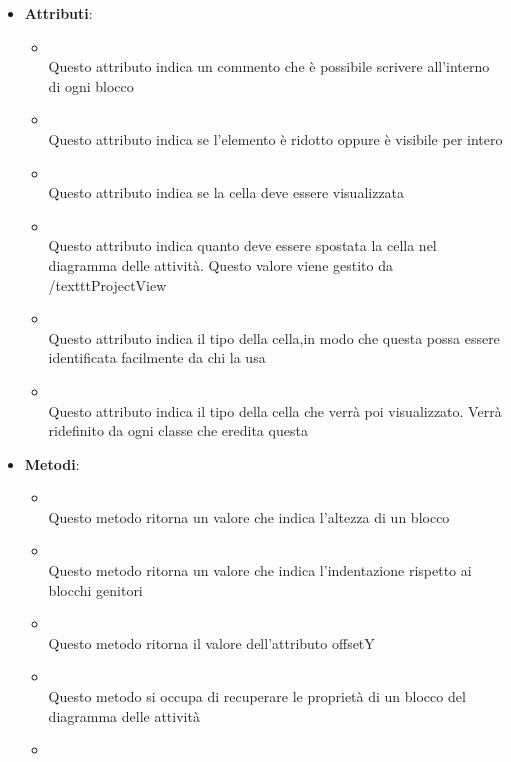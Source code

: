 \begin{itemize}
\begin{itemize}
\end{itemize}
\item \textbf{Attributi}:
\begin{itemize}
\item {}
\\ Questo attributo indica un commento che è possibile scrivere all'interno di ogni blocco
\item {}
\\ Questo attributo indica se l'elemento è ridotto oppure è visibile per intero
\item {}
\\ Questo attributo indica se la cella deve essere visualizzata
\item {}
\\ Questo attributo indica quanto deve essere spostata la cella nel diagramma delle attività. Questo valore viene gestito da /texttt{ProjectView}
\item {}
\\ Questo attributo indica il tipo della cella,in modo  che questa possa essere identificata facilmente da chi la usa
\item {}
\\ Questo attributo indica il tipo della cella che verrà poi visualizzato. Verrà ridefinito da ogni classe che eredita questa
\end{itemize}
\item \textbf{Metodi}:
\begin{itemize}
\item {}
\\ Questo metodo ritorna un valore che indica l'altezza di un blocco
\item {}
\\ Questo metodo ritorna un valore che indica l'indentazione rispetto ai blocchi genitori
\item {}
\\ Questo metodo ritorna il valore dell'attributo offsetY
\item {}
\\ Questo metodo si occupa di recuperare le proprietà di un blocco del diagramma delle attività
\item {}

\end{itemize}
\end{itemize}
